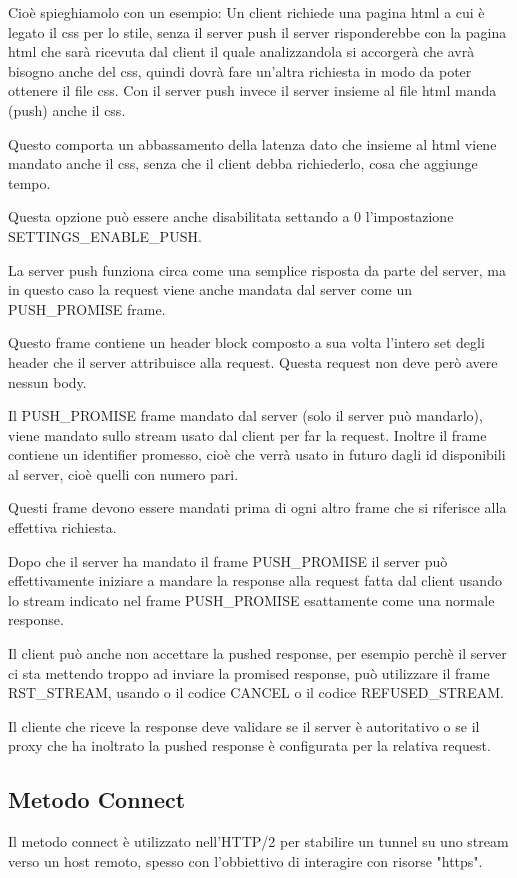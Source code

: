 \documentclass[12pt, a4paper]{article} %
\begin{document}
Cioè spieghiamolo con un esempio: Un client richiede una pagina html a cui è legato il css per lo stile, senza il server push il server risponderebbe con la pagina html che sarà ricevuta dal client il quale analizzandola si accorgerà che avrà bisogno anche del css, quindi dovrà fare 
un'altra richiesta in modo da poter ottenere il file css.
Con il server push invece il server insieme al file html manda (push) anche il css.

Questo comporta un abbassamento della latenza dato che insieme al html viene mandato anche il css, senza che il client debba richiederlo, cosa che aggiunge tempo.

Questa opzione può essere anche disabilitata settando a 0 l'impostazione SETTINGS\_ENABLE\_PUSH.

La server push funziona circa come una semplice risposta da parte del server, ma in questo caso la request viene anche mandata dal server come un PUSH\_PROMISE frame.

Questo frame contiene un header block composto a sua volta l'intero set degli header che il server attribuisce alla request. Questa request non deve però avere nessun body.

Il PUSH\_PROMISE frame mandato dal server (solo il server può mandarlo), viene mandato sullo stream usato dal client per far la request. Inoltre il frame contiene un identifier promesso, cioè che verrà usato in futuro dagli id disponibili al server, cioè quelli con numero pari.

Questi frame devono essere mandati prima di ogni altro frame che si riferisce alla effettiva richiesta.

Dopo che il server ha mandato il frame PUSH\_PROMISE il server può effettivamente iniziare a mandare la response alla request fatta dal client usando lo stream indicato nel frame PUSH\_PROMISE esattamente come una normale response.

Il client può anche non accettare la pushed response, per esempio perchè il server ci sta mettendo troppo ad inviare la promised response, può utilizzare il frame RST\_STREAM, usando o il codice CANCEL o il codice REFUSED\_STREAM.

Il cliente che riceve la response deve validare se il server è autoritativo o se il proxy che ha inoltrato la pushed response è configurata per la relativa request.

\subsection{Metodo Connect}
Il metodo connect è utilizzato nell'HTTP/2 per stabilire un tunnel su uno stream verso un host remoto, spesso con l'obbiettivo di interagire con risorse "https".
\end{document}
